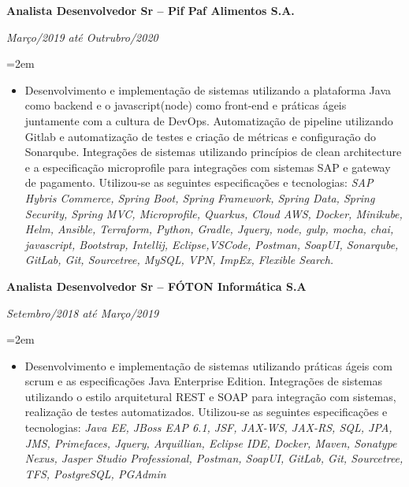 \documentclass[paper=a4,fontsize=11pt]{scrartcl} %
\newcommand{\EducationEntry}[4]{
		\noindent \textbf{#1} \hfill      %
		\colorbox{White}{%
			\parbox{5cm}{%
			\hfill\color{Black}#2}} \par  %
		\noindent \textit{#3} \par        %
		\noindent\hangindent=2em\hangafter=0 \small #4 %
		\normalsize \par}
\begin{document}
\EducationEntry{Analista Desenvolvedor Sr – Pif Paf Alimentos S.A.}{}{Março/2019 até Outrubro/2020}{
	\begin{itemize}
		\item{Desenvolvimento e implementação de sistemas utilizando a plataforma Java como backend
		e o javascript(node) como front-end e práticas ágeis juntamente com a cultura de DevOps.
		Automatização de pipeline utilizando Gitlab e automatização de testes e criação de métricas
		e configuração do Sonarqube. Integrações de sistemas utilizando princípios de clean architecture 
		e a especificação microprofile para integrações com sistemas SAP e gateway de pagamento. 
		Utilizou-se as seguintes especificações e tecnologias: \newline \newline
		      \textit{SAP Hybris Commerce, Spring Boot, Spring Framework, Spring Data, Spring Security, Spring MVC,
			  Microprofile, Quarkus, Cloud AWS, Docker, Minikube, Helm, Ansible, Terraform, Python, Gradle,
			  Jquery, node, gulp, mocha, chai, javascript, Bootstrap, Intellij, Eclipse,VSCode, Postman, SoapUI, 
			  Sonarqube, GitLab, Git, Sourcetree, MySQL, VPN, ImpEx, Flexible Search.}}

	\end{itemize}
}

\EducationEntry{Analista Desenvolvedor Sr – FÓTON Informática S.A}{}{Setembro/2018 até Março/2019}{
	\begin{itemize}
		\item{Desenvolvimento e implementação de sistemas utilizando práticas ágeis com scrum e as
		especificações Java Enterprise Edition. Integrações de sistemas utilizando o estilo
		arquitetural REST e SOAP para integração com sistemas, realização de testes
		automatizados. Utilizou-se as seguintes especificações e tecnologias: \newline \newline
		      \textit{Java EE, JBoss EAP 6.1, JSF, JAX-WS, JAX-RS, SQL, JPA, JMS, Primefaces, Jquery,
			  Arquillian, Eclipse IDE, Docker, Maven, Sonatype Nexus, Jasper Studio Professional, Postman,
			  SoapUI, GitLab, Git, Sourcetree, TFS, PostgreSQL, PGAdmin}}

	\end{itemize}
}
\end{document}
